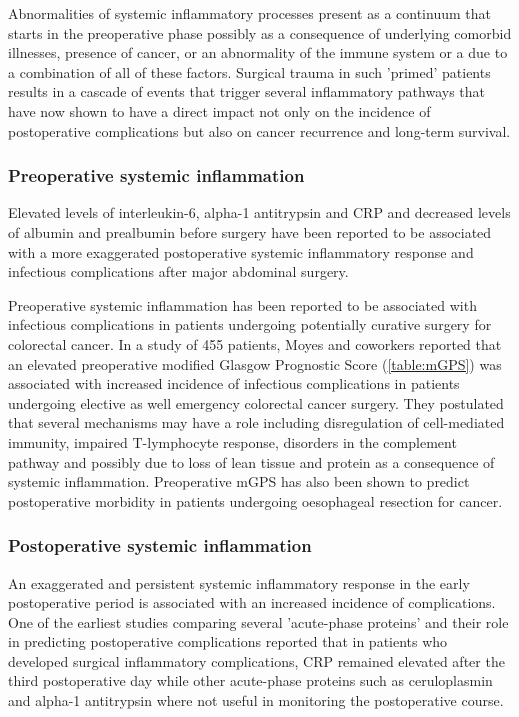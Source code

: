 Abnormalities of systemic inflammatory processes present as a continuum that starts in the preoperative phase possibly as a consequence of underlying comorbid illnesses, presence of cancer, or an abnormality of the immune system or a due to a combination of all of these factors. Surgical trauma in such 'primed' patients results in a cascade of events that trigger several inflammatory pathways that have now shown to have a direct impact not only on the incidence of postoperative complications but also on cancer recurrence and long-term survival.

\subsubsection{Preoperative systemic inflammation}
Elevated levels of interleukin-6, alpha-1 antitrypsin and CRP and decreased levels of albumin and prealbumin before surgery have been reported to be associated with a more exaggerated postoperative systemic inflammatory response and infectious complications after major abdominal surgery.\parencite{haupt_association_1997}

Preoperative systemic inflammation has been reported to be associated with infectious complications in patients undergoing potentially curative surgery for colorectal cancer.\parencite{moyes_preoperative_2009} In a study of 455 patients, Moyes and coworkers reported that an elevated preoperative modified Glasgow Prognostic Score (\ref{table:mGPS}) was associated with increased incidence of infectious complications in patients undergoing elective as well emergency colorectal cancer surgery. They postulated that several mechanisms may have a role including disregulation of cell-mediated immunity, impaired T-lymphocyte response, disorders in the complement pathway and possibly due to loss of lean tissue and protein as a consequence of systemic inflammation. Preoperative mGPS has also been shown to predict postoperative morbidity in patients undergoing oesophageal resection for cancer.\parencite{vashist_glasgow_2010} 

\subsubsection{Postoperative systemic inflammation}
An exaggerated and persistent systemic inflammatory response in the early postoperative period is associated with an increased incidence of complications. One of the earliest studies comparing several 'acute-phase proteins' and their role in predicting postoperative complications reported that in patients who developed surgical inflammatory complications, CRP remained elevated after the third postoperative day while other acute-phase proteins such as ceruloplasmin and alpha-1 antitrypsin where not useful in monitoring the postoperative course.\parencite{fischer_quantitation_1976} 

